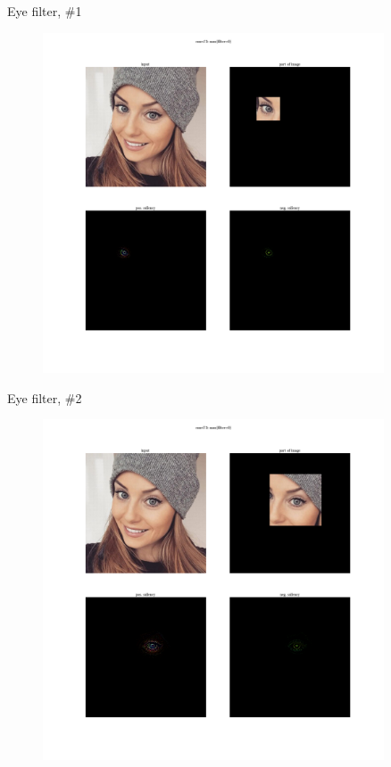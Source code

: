\documentclass{beamer}
\begin{document}
\begin{frame}{Eye filter, \#1}

\begin{figure}[h!]
  \centering
  \includegraphics[width=0.9\textwidth]{images/eye1.png}
\end{figure}

\end{frame}


\begin{frame}{Eye filter, \#2}

\begin{figure}[h!]
  \centering
  \includegraphics[width=0.9\textwidth]{images/eye2.png}
\end{figure}

\end{frame}
\end{document}
